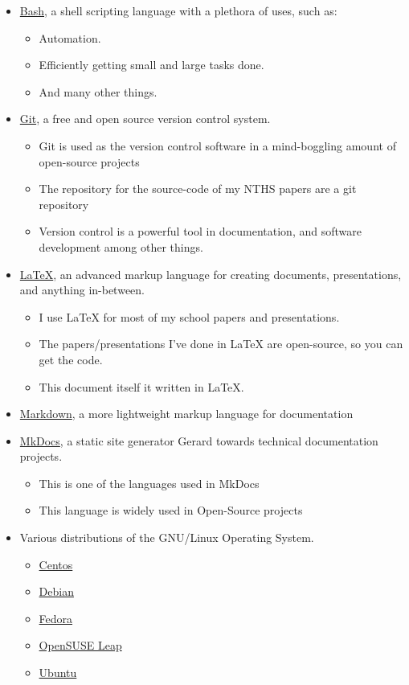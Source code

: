 \begin{itemize}
	\item {\href{https://www.gnu.org/software/bash/}{Bash}, a shell scripting language with a plethora of uses, such as:}
		\begin{itemize}
			\item Automation.
			\item Efficiently getting small and large tasks done.
			\item And many other things.
		\end{itemize}
	\item {\href{https://git-scm.com/}{Git}, a free and open source version control system.}
		\begin{itemize}
			\item Git is used as the version control software in a mind-boggling amount of open-source projects
			\item The repository for the source-code of my NTHS papers are a git repository
			\item Version control is a powerful tool in documentation, and software development among other things.
		\end{itemize}
	\item {\href{https://www.latex-project.org/}{\LaTeX{}}, an advanced markup language for creating documents, presentations, and anything in-between.}
		\begin{itemize}
			\item I use \LaTeX{} for most of my school papers and presentations.
			\item The papers/presentations I've done in \LaTeX{} are open-source, so you can get the code.
			\item This document itself it written in \LaTeX{}.
		\end{itemize}
	\item {\href{https://guides.github.com/features/mastering-markdown/}{Markdown}, a more lightweight markup language for documentation}
	\item { \href{http://www.mkdocs.org/}{MkDocs}, a static site generator Gerard towards technical documentation projects.}
		\begin{itemize}
			\item This is one of the languages used in MkDocs
			\item This language is widely used in Open-Source projects
		\end{itemize}
	\item {Various distributions of the GNU/Linux Operating System.}
		\begin{itemize}
			\item {\href{https://www.centos.org/}{Centos}}
			\item {\href{https://www.debian.org/}{Debian}}
			\item {\href{https://getfedora.org/}{Fedora}}
			\item {\href{https://www.opensuse.org/}{OpenSUSE Leap}}
			\item {\href{https://www.ubuntu.com/}{Ubuntu}}
		\end{itemize}
\end{itemize}

